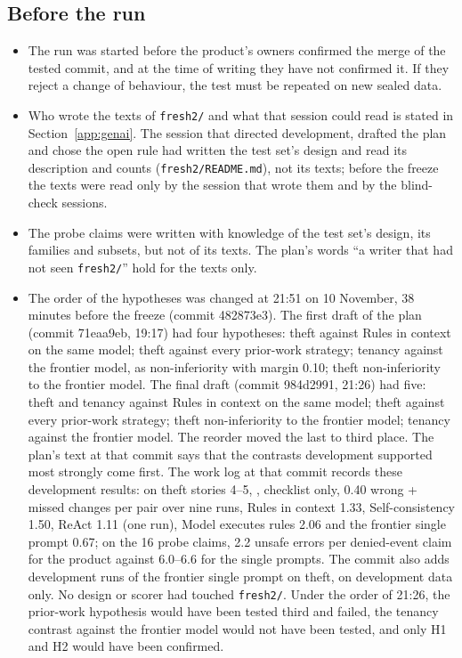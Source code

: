 \subsection{Before the run}
\begin{itemize}[leftmargin=1.2em,itemsep=1pt]
\item The run was started before the product's owners confirmed the merge of the tested commit, and at the time of writing they have not confirmed it. If they reject a change of behaviour, the test must be repeated on new sealed data.
\item Who wrote the texts of \texttt{fresh2/} and what that session could read is stated in Section~\ref{app:genai}. The session that directed development, drafted the plan and chose the open rule had written the test set's design and read its description and counts (\texttt{fresh2/\allowbreak{}README.md}), not its texts; before the freeze the texts were read only by the session that wrote them and by the blind-check sessions.
\item The probe claims were written with knowledge of the test set's design, its families and subsets, but not of its texts. The plan's words ``a writer that had not seen \texttt{fresh2/}'' hold for the texts only.
\item The order of the hypotheses was changed at 21:51 on 10 November, 38 minutes before the freeze (commit 482873e3). The first draft of the plan (commit 71eaa9eb, 19:17) had four hypotheses: theft against Rules in context on the same model; theft against every prior-work strategy; tenancy against the frontier model, as non-inferiority with margin 0.10; theft non-inferiority to the frontier model. The final draft (commit 984d2991, 21:26) had five: theft and tenancy against Rules in context on the same model; theft against every prior-work strategy; theft non-inferiority to the frontier model; tenancy against the frontier model. The reorder moved the last to third place. The plan's text at that commit says that the contrasts development supported most strongly come first. The work log at that commit records these development results: on theft stories 4--5, \casepath, checklist only, 0.40 wrong + missed changes per pair over nine runs, Rules in context 1.33, Self-consistency 1.50, ReAct 1.11 (one run), Model executes rules 2.06 and the frontier single prompt 0.67; on the 16 probe claims, 2.2 unsafe errors per denied-event claim for the product against 6.0--6.6 for the single prompts. The commit also adds development runs of the frontier single prompt on theft, on development data only. No design or scorer had touched \texttt{fresh2/}. Under the order of 21:26, the prior-work hypothesis would have been tested third and failed, the tenancy contrast against the frontier model would not have been tested, and only H1 and H2 would have been confirmed.

\end{itemize}
